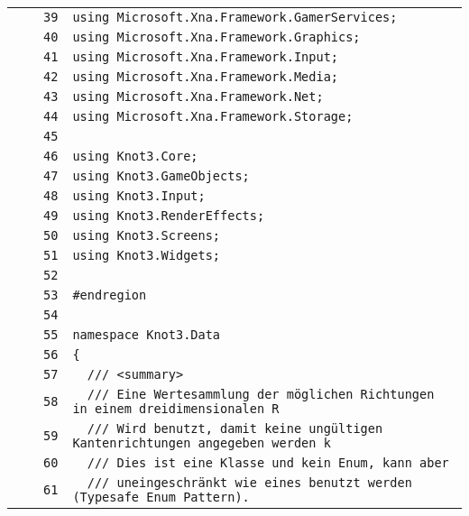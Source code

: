 \documentclass[a4paper,10pt]{article}
\begin{document}
\begin{longtable}[l]{lrrl}
\cellcolor{gray} &  & \verb~39~ & \verb~using Microsoft.Xna.Framework.GamerServices;~\\
\cellcolor{gray} &  & \verb~40~ & \verb~using Microsoft.Xna.Framework.Graphics;~\\
\cellcolor{gray} &  & \verb~41~ & \verb~using Microsoft.Xna.Framework.Input;~\\
\cellcolor{gray} &  & \verb~42~ & \verb~using Microsoft.Xna.Framework.Media;~\\
\cellcolor{gray} &  & \verb~43~ & \verb~using Microsoft.Xna.Framework.Net;~\\
\cellcolor{gray} &  & \verb~44~ & \verb~using Microsoft.Xna.Framework.Storage;~\\
\cellcolor{gray} &  & \verb~45~ & \verb~~\\
\cellcolor{gray} &  & \verb~46~ & \verb~using Knot3.Core;~\\
\cellcolor{gray} &  & \verb~47~ & \verb~using Knot3.GameObjects;~\\
\cellcolor{gray} &  & \verb~48~ & \verb~using Knot3.Input;~\\
\cellcolor{gray} &  & \verb~49~ & \verb~using Knot3.RenderEffects;~\\
\cellcolor{gray} &  & \verb~50~ & \verb~using Knot3.Screens;~\\
\cellcolor{gray} &  & \verb~51~ & \verb~using Knot3.Widgets;~\\
\cellcolor{gray} &  & \verb~52~ & \verb~~\\
\cellcolor{gray} &  & \verb~53~ & \verb~#endregion~\\
\cellcolor{gray} &  & \verb~54~ & \verb~~\\
\cellcolor{gray} &  & \verb~55~ & \verb~namespace Knot3.Data~\\
\cellcolor{gray} &  & \verb~56~ & \verb~{~\\
\cellcolor{gray} &  & \verb~57~ & \verb~  /// <summary>~\\
\cellcolor{gray} &  & \verb~58~ & \verb~  /// Eine Wertesammlung der möglichen Richtungen in einem dreidimensionalen R~\\
\cellcolor{gray} &  & \verb~59~ & \verb~  /// Wird benutzt, damit keine ungültigen Kantenrichtungen angegeben werden k~\\
\cellcolor{gray} &  & \verb~60~ & \verb~  /// Dies ist eine Klasse und kein Enum, kann aber~\\
\cellcolor{gray} &  & \verb~61~ & \verb~  /// uneingeschränkt wie eines benutzt werden (Typesafe Enum Pattern).~\\

\end{longtable}
\end{document}
